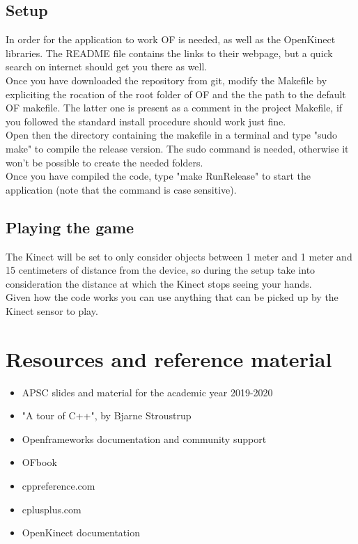 \documentclass[]{article}
\begin{document}
\subsection{Setup}
In order for the application to work OF is needed, as well as the OpenKinect libraries. The README file contains the links to their webpage, but a quick search on internet should get you there as well.\\
Once you have downloaded the repository from git, modify the Makefile by expliciting the rocation of the root folder of OF and the the path to the default OF makefile. The latter one is present as a comment in the project Makefile, if you followed the standard install procedure should work just fine.\\  
Open then the directory containing the makefile in a terminal and type "sudo make" to compile the release version. The sudo command is needed, otherwise it won't be possible to create the needed folders.\\
Once you have compiled the code, type "make RunRelease" to start the application (note that the command is case sensitive).
\subsection{Playing the game}
The Kinect will be set to only consider objects between 1 meter and 1 meter and 15 centimeters of distance from the device, so during the setup take into consideration the distance at which the Kinect stops seeing your hands.\\
Given how the code works you can use anything that can be picked up by the Kinect sensor to play.

\newpage
\section{Resources and reference material}
\begin{itemize}
	\item APSC slides and material for the academic year 2019-2020
	\item "A tour of C++", by Bjarne Stroustrup
	\item Openframeworks documentation and community support
	\item OFbook
	\item cppreference.com
	\item cplusplus.com
	\item OpenKinect documentation
\end{itemize}
\end{document}
